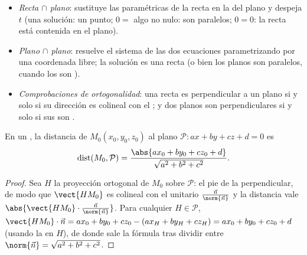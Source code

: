 \begin{method}\label{met:g12:space:intersections}
\begin{itemize}
  \item \emph{Recta $\cap$ plano}: sustituye las  paramétricas
        de la recta en la  del plano y despeja $t$ (una solución:
        un punto; $0 = $ algo no nulo: son paralelos; $0 = 0$: la recta
        está contenida en el plano).
  \item \emph{Plano $\cap$ plano}: resuelve el sistema de las dos
        ecuaciones parametrizando por una coordenada libre; la solución es
        una recta (o bien los planos son paralelos, cuando los  son ).
  \item \emph{Comprobaciones de ortogonalidad}: una recta es perpendicular
        a un plano si y solo si su dirección es colineal con el ; y dos planos son perpendiculares si y solo si sus  son .
\end{itemize}
\end{method}

\begin{proposition}\label{prop:g12:space:distance}
En un , la distancia de $M_0(x_0, y_0, z_0)$ al plano
$\mathcal P : ax + by + cz + d = 0$ es
\[
\operatorname{dist}(M_0, \mathcal P)
= \frac{\abs{ax_0 + by_0 + cz_0 + d}}{\sqrt{a^2 + b^2 + c^2}}.
\]
\end{proposition}

\begin{proof}
Sea $H$ la proyección ortogonal de $M_0$ sobre $\mathcal P$: el pie de la
perpendicular, de modo que $\vect{HM_0}$ es colineal con el 
unitario $\frac{\vec n}{\norm{\vec n}}$ y la distancia vale
$\abs{\vect{HM_0}\cdot \frac{\vec n}{\norm{\vec n}}}$. Para cualquier
$H \in \mathcal P$,
$\vect{HM_0}\cdot\vec n = ax_0 + by_0 + cz_0 - (ax_H + by_H + cz_H)
= ax_0 + by_0 + cz_0 + d$ (usando la  en $H$), de donde sale la
fórmula tras dividir entre $\norm{\vec n} = \sqrt{a^2+b^2+c^2}$.
\end{proof}

